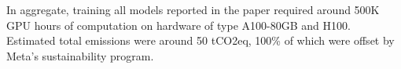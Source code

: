 In aggregate, training all models reported in the paper required around 500K GPU hours of computation on hardware of type A100-80GB and H100. Estimated total emissions were around 50 tCO2eq, 100\% of which were offset by Meta’s sustainability program.
